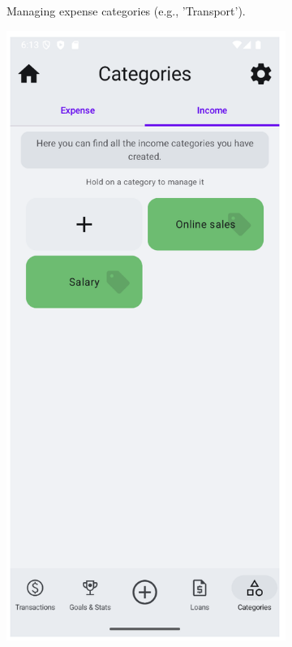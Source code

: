\documentclass[a4paper,12pt]{article}
\begin{document}
\begin{figure}[H]
\begin{subfigure}[b]{0.23\textwidth}
        \caption{Managing expense categories (e.g., 'Transport').}
        \label{fig:categories_expense}
    \end{subfigure}
    \hfill
    \begin{subfigure}[b]{0.23\textwidth}
        \includegraphics[width=\textwidth]{categories_income.png}

\end{subfigure}
\end{figure}
\end{document}

